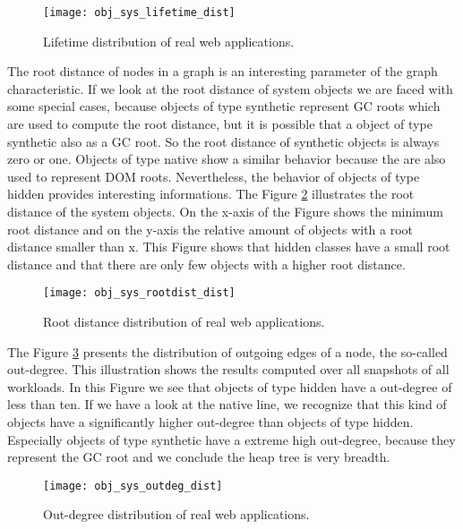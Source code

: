 \begin{figure}
	\centering
	\texttt{[image: obj\_sys\_lifetime\_dist]}
	\caption{Lifetime distribution of real web applications.}
	\label{fig:obj_sys_lieftiem_dist}
\end{figure}

The root distance of nodes in a graph is an interesting parameter of the graph characteristic. If we look at the root distance of system objects we are faced with some special cases, because objects of type synthetic represent GC roots which are used to compute the root distance, but it is possible that a object of type synthetic also as a GC root. So the root distance of synthetic objects is always zero or one. Objects of type native show a similar behavior because the are also used to represent DOM roots. Nevertheless, the behavior of objects of type hidden provides interesting informations. The Figure \ref{fig:obj_sys_rootdist_dist} illustrates the root distance of the system objects. On the x-axis of the Figure shows the minimum root distance and on the y-axis the relative amount of objects with a root distance smaller than x. This Figure shows that hidden classes have a small root distance and that there are only few objects with a higher root distance.

\begin{figure}
	\centering
	\texttt{[image: obj\_sys\_rootdist\_dist]}
	\caption{Root distance distribution of real web applications.}
	\label{fig:obj_sys_rootdist_dist}
\end{figure}

The Figure \ref{fig:obj_sys_outdeg_dist} presents the distribution of outgoing edges of a node, the so-called out-degree. This illustration shows the results computed over all snapshots of all workloads. In this Figure we see that objects of type hidden have a out-degree of less than ten. If we have a look at the native line, we recognize that this kind of objects have a significantly higher out-degree than objects of type hidden. Especially objects of type synthetic have a extreme high out-degree, because they represent the GC root and we conclude the heap tree is very breadth.   

\begin{figure}
	\centering
	\texttt{[image: obj\_sys\_outdeg\_dist]}
	\caption{Out-degree distribution of real web applications.}
	\label{fig:obj_sys_outdeg_dist}
\end{figure}

% 
